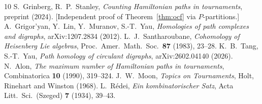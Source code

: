 \documentclass[11pt,reqno]{amsart}
\theoremstyle{plain}
\theoremstyle{definition}
\theoremstyle{remark}
\begin{document}
\vspace{2pt}
\begin{thebibliography}{10}
 S.~Grinberg, R.~P.~Stanley, \textit{Counting Hamiltonian paths
in tournaments}, preprint (2024).  [Independent proof of Theorem~\ref{thm:ocf}
via $P$-partitions.]
 A.~Grigor'yan, Y.~Lin, Y.~Muranov, S.-T.~Yau,
\textit{Homologies of path complexes and digraphs}, arXiv:1207.2834 (2012).
 L.~J.~Santharoubane, \textit{Cohomology of Heisenberg Lie
algebras}, Proc.\ Amer.\ Math.\ Soc.\ \textbf{87} (1983), 23--28.
 K.~B.~Tang, S.-T.~Yau, \textit{Path homology of circulant
digraphs}, arXiv:2602.04140 (2026).
 N.~Alon, \textit{The maximum number of Hamiltonian paths in
tournaments}, Combinatorica \textbf{10} (1990), 319--324.
 J.~W.~Moon, \textit{Topics on Tournaments}, Holt, Rinehart and
Winston (1968).
 L.~R\'edei, \textit{Ein kombinatorischer Satz}, Acta Litt.\
Sci.\ (Szeged) \textbf{7} (1934), 39--43.
\end{thebibliography}
\end{document}
